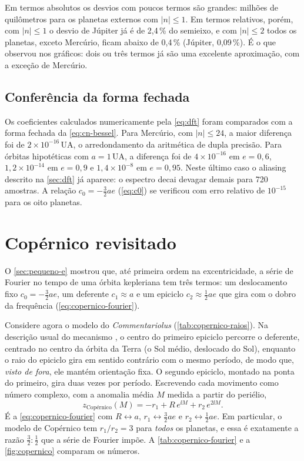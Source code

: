 Em termos absolutos os desvios com poucos termos são grandes: milhões de quilômetros para os planetas externos com $|n|\leq1$. Em termos relativos, porém, com $|n|\leq1$ o desvio de Júpiter já é de 2,4\,\% do semieixo, e com $|n|\leq2$ todos os planetas, exceto Mercúrio, ficam abaixo de 0,4\,\% (Júpiter, 0,09\,\%). É o que  observou nos gráficos: dois ou três termos já são uma excelente aproximação, com a exceção de Mercúrio.

\subsection{Conferência da forma fechada}

Os coeficientes calculados numericamente pela \autoref{eq:dft} foram comparados com a forma fechada da \autoref{eq:cn-bessel}. Para Mercúrio, com $|n|\leq 24$, a maior diferença foi de $2\times10^{-16}$\,UA, o arredondamento da aritmética de dupla precisão. Para órbitas hipotéticas com $a = 1$\,UA, a diferença foi de $4\times10^{-16}$ em $e = 0{,}6$, $1{,}2\times10^{-14}$ em $e = 0{,}9$ e $1{,}4\times10^{-8}$ em $e=0{,}95$. Neste último caso o aliasing descrito na \autoref{sec:dft} já aparece: o espectro decai devagar demais para 720 amostras. A relação $c_0 = -\frac32 ae$ (\autoref{eq:c0}) se verificou com erro relativo de $10^{-15}$ para os oito planetas.

\section{Copérnico revisitado}\label{sec:copernico-revisitado}

O \autoref{sec:pequeno-e} mostrou que, até primeira ordem na excentricidade, a série de Fourier no tempo de uma órbita kepleriana tem três termos: um deslocamento fixo $c_0 = -\frac32 ae$, um deferente $c_1\approx a$ e um epiciclo $c_2\approx\frac12 ae$ que gira com o dobro da frequência (\autoref{eq:copernico-fourier}).

Considere agora o modelo do \emph{Commentariolus} (\autoref{tab:copernico-raios}). Na descrição usual do mecanismo \cite{gallavotti1999,sugon2008}, o centro do primeiro epiciclo percorre o deferente, centrado no centro da órbita da Terra (o Sol médio, deslocado do Sol), enquanto o raio do epiciclo gira em sentido contrário com o mesmo período, de modo que, \emph{visto de fora}, ele mantém orientação fixa. O segundo epiciclo, montado na ponta do primeiro, gira duas vezes por período. Escrevendo cada movimento como número complexo, com a anomalia média $M$ medida a partir do periélio,
\begin{equation}
  z_\text{Copérnico}(M) = -r_1 + R\,e^{\ii M} + r_2\,e^{2\ii M}.
  \label{eq:copernico-modelo} %
\end{equation}
É a \autoref{eq:copernico-fourier} com $R \leftrightarrow a$, $r_1 \leftrightarrow \frac32 ae$ e $r_2 \leftrightarrow \frac12 ae$. Em particular, o modelo de Copérnico tem $r_1/r_2 = 3$ para \emph{todos} os planetas, e essa é exatamente a razão $\frac32 : \frac12$ que a série de Fourier impõe. A \autoref{tab:copernico-fourier} e a \autoref{fig:copernico} comparam os números.

